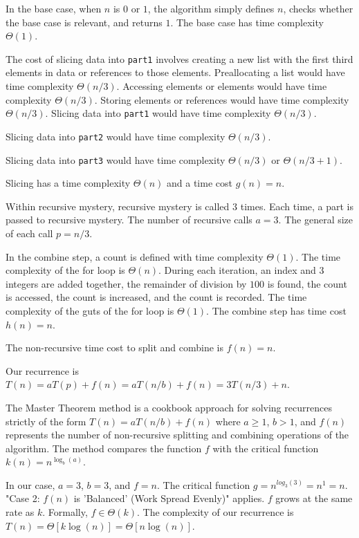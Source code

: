 \documentclass{article}
\begin{document}
In the base case, when $n$ is $0$ or $1$, the algorithm simply defines $n$, checks whether the base case is relevant, and returns $1$. The base case has time complexity $\Theta(1)$.

The cost of slicing data into \texttt{part1} involves creating a new list with the first third elements in data or references to those elements. Preallocating a list would have time complexity $\Theta(n/3)$. Accessing elements or elements would have time complexity $\Theta(n/3)$. Storing elements or references would have time complexity $\Theta(n/3)$. Slicing data into \texttt{part1} would have time complexity $\Theta(n/3)$.

Slicing data into \texttt{part2} would have time complexity $\Theta(n/3)$.

Slicing data into \texttt{part3} would have time complexity $\Theta(n/3)$ or $\Theta(n/3 + 1)$.

Slicing has a time complexity $\Theta(n)$ and a time cost $g(n) = n$.

Within recursive mystery, recursive mystery is called $3$ times. Each time, a part is passed to recursive mystery. The number of recursive calls $a = 3$. The general size of each call $p = n/3$.

In the combine step, a count is defined with time complexity $\Theta(1)$. The time complexity of the for loop is $\Theta(n)$. During each iteration, an index and 3 integers are added together, the remainder of division by $100$ is found, the count is accessed, the count is increased, and the count is recorded. The time complexity of the guts of the for loop is $\Theta(1)$. The combine step has time cost $h(n) = n$.

The non-recursive time cost to split and combine is $f(n) = n$.

Our recurrence is $T(n) = a T(p) + f(n) = a T(n/b) + f(n) = 3 T(n/3) + n$.

The Master Theorem method is a cookbook approach for solving recurrences strictly of the form $T(n) = a T(n/b) + f(n)$ where $a \geq 1$, $b > 1$, and $f(n)$ represents the number of non-recursive splitting and combining operations of the algorithm. The method compares the function $f$ with the critical function $k(n) = n^{\log_b(a)}$.

In our case, $a = 3$, $b = 3$, and $f = n$. The critical function $g = n^{log_3(3)} = n^1 = n$. "Case 2: $f(n)$ is 'Balanced' (Work Spread Evenly)" applies. $f$ grows at the same rate as $k$. Formally, $f \in \Theta(k)$. The complexity of our recurrence is $T(n) = \Theta[k \log(n)] = \Theta[n \log(n)]$.\\
\end{document}
